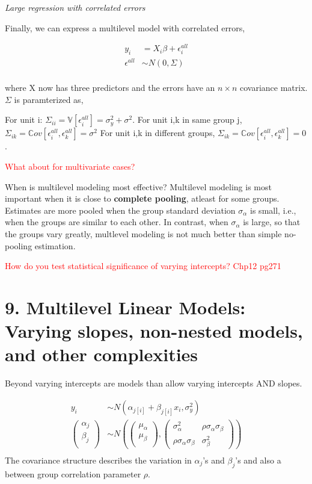 \documentclass[12pt,]{article}
\begin{document}
\textit{Large regression with correlated errors}

Finally, we can express a multilevel model with correlated errors,

\[
\begin{aligned}
y_i &= X_i\beta + \epsilon^{all}_i\\
\epsilon^{all} &\sim N(0, \Sigma)\\
\end{aligned}
\]

where X now has three predictors and the errors have an \(n \times n\)
covariance matrix. \(\Sigma\) is paramterized as,

For unit i:
\(\Sigma_{ii} = \mathbb{V}[\epsilon^{all}_i] = \sigma^2_y + \sigma^2\).
For unit i,k in same group j,
\(\Sigma_{ik} = \mathbb{C}ov[\epsilon^{all}_i, \epsilon^{all}_k] = \sigma^2\)
For unit i,k in different groups,
\(\Sigma_{ik} = \mathbb{C}ov[\epsilon^{all}_i, \epsilon^{all}_k] = 0\).

\textcolor{red}{What about for multivariate cases?}

When is multilevel modeling most effective? Multilevel modeling is most
important when it is close to \textbf{complete pooling}, atleast for
some groups. Estimates are more pooled when the group standard deviation
\(\sigma_\alpha\) is small, i.e., when the groups are similar to each
other. In contrast, when \(\sigma_\alpha\) is large, so that the groups
vary greatly, multlevel modeling is not much better than simple
no-pooling estimation.

\textcolor{red}{How do you test statistical significance of varying intercepts? Chp12 pg271}

\section{9. Multilevel Linear Models: Varying slopes, non-nested models,
and other
complexities}\label{multilevel-linear-models-varying-slopes-non-nested-models-and-other-complexities}

Beyond varying intercepts are models than allow varying intercepts AND
slopes.

\[
\begin{aligned}
y_i &\sim N (\alpha_{j[i]} + \beta_{j[i]}x_i, \sigma^2_y)\\
\begin{pmatrix}
\alpha_j\\
\beta_j\\
\end{pmatrix} &\sim N \left(\begin{pmatrix}\mu_\alpha\\\mu_\beta\\ 
\end{pmatrix}, 
\begin{pmatrix}
\sigma^2_\alpha & \rho \sigma_\alpha \sigma_\beta\\
\rho \sigma_\alpha \sigma_\beta & \sigma^2_\beta
\end{pmatrix} 
\right)\\
\end{aligned}
\] The covariance structure describes the variation in \(\alpha_j\)'s
and \(\beta_j\)'s and also a between group correlation parameter
\(\rho\).
\end{document}
